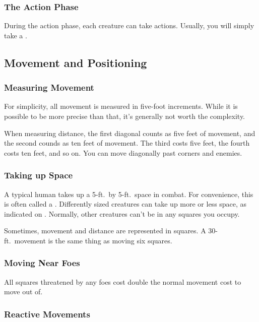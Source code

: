         \subsubsection{The Action Phase}\label{The Action Phase}
            During the action phase, each creature can take actions.
            Usually, you will simply take a .

    \subsection{Movement and Positioning}

        \subsubsection{Measuring Movement}

            For simplicity, all movement is measured in five-foot increments.
            While it is possible to be more precise than that, it's generally not worth the complexity.

             When measuring distance, the first diagonal counts as five feet of movement, and the second counds as ten feet of movement.
            The third costs five feet, the fourth costs ten feet, and so on.
            You can move diagonally past corners and enemies.

        \subsubsection{Taking up Space}
            A typical human takes up a 5-ft.\ by 5-ft.\ space in combat.
            For convenience, this is often called a .
            Differently sized creatures can take up more or less space, as indicated on .
            Normally, other creatures can't be in any squares you occupy.

            Sometimes, movement and distance are represented in squares.
            A 30-ft.\ movement is the same thing as moving six squares.

        \subsubsection{Moving Near Foes}\label{Moving Near Foes}
            All squares threatened by any foes cost double the normal movement cost to move out of.

        \subsubsection{Reactive Movements}


